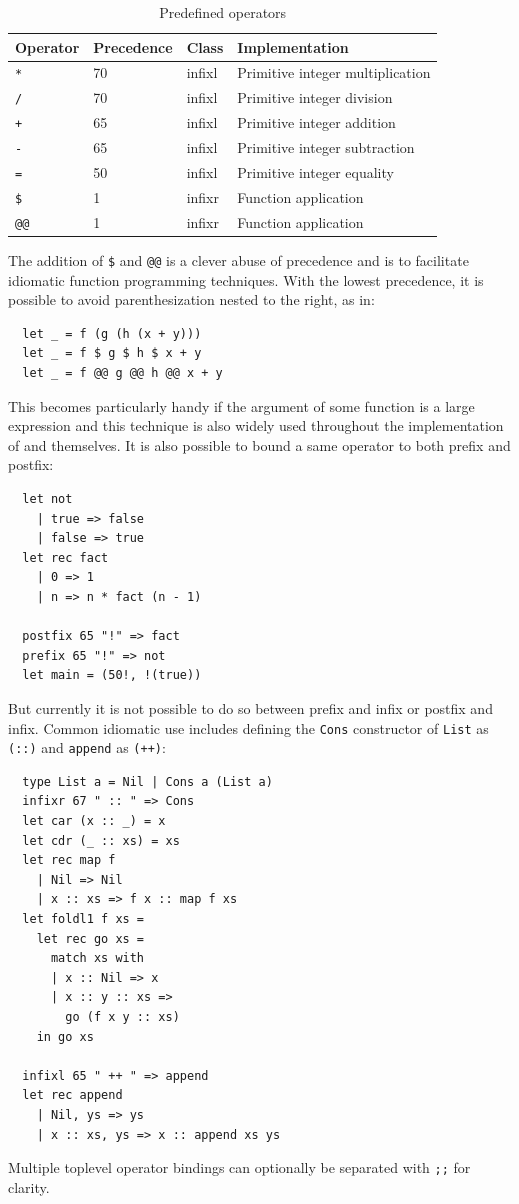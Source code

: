 \documentclass[a4paper, 11pt]{article}
\theoremstyle{remark}\newtheorem*{remark}{Remark}
\theoremstyle{definition}\newtheorem*{definition}{Definition}
\begin{document}
\begin{table}[]
  \centering
  \begin{tabular}{@{}llll@{}}
    \toprule
    Operator & Precedence & Class  & Implementation                   \\ \midrule
    \texttt{*}        & 70         & infixl & Primitive integer multiplication \\
    \texttt{/}        & 70         & infixl & Primitive integer division       \\
    \texttt{+}        & 65         & infixl & Primitive integer addition       \\
    \texttt{-}        & 65         & infixl & Primitive integer subtraction    \\
    \texttt{=}        & 50         & infixl & Primitive integer equality       \\
    \texttt{\$}       & 1          & infixr & Function application             \\
    \texttt{@@}       & 1          & infixr & Function application             \\ \bottomrule
  \end{tabular}
  \caption{Predefined operators}\label{tab:exproperator-prec}
\end{table}
The addition of \texttt{\$} and \texttt{@@} is a clever abuse of precedence and
is to facilitate idiomatic function programming techniques.
With the lowest precedence, it is possible to avoid parenthesization nested to the right, as in:
\begin{verbatim}
  let _ = f (g (h (x + y)))
  let _ = f $ g $ h $ x + y
  let _ = f @@ g @@ h @@ x + y
\end{verbatim}
This becomes particularly handy if the argument of some function is a large expression and this technique
is also widely used throughout the implementation of \Tigris and \Tigrisd themselves.
It is also possible to bound a same operator to both prefix and postfix:
\begin{verbatim}
  let not
    | true => false
    | false => true
  let rec fact
    | 0 => 1
    | n => n * fact (n - 1)

  postfix 65 "!" => fact
  prefix 65 "!" => not
  let main = (50!, !(true))
\end{verbatim}
But currently it is not possible to do so between prefix and infix or postfix and infix.
Common idiomatic use includes defining the \texttt{Cons} constructor of \texttt{List} as
\texttt{(::)} and \texttt{append} as \texttt{(++)}:
\begin{verbatim}
  type List a = Nil | Cons a (List a)
  infixr 67 " :: " => Cons
  let car (x :: _) = x
  let cdr (_ :: xs) = xs
  let rec map f
    | Nil => Nil
    | x :: xs => f x :: map f xs
  let foldl1 f xs =
    let rec go xs =
      match xs with
      | x :: Nil => x
      | x :: y :: xs =>
        go (f x y :: xs)
    in go xs

  infixl 65 " ++ " => append
  let rec append
    | Nil, ys => ys
    | x :: xs, ys => x :: append xs ys

\end{verbatim}
Multiple toplevel operator bindings can optionally be separated with \texttt{;;} for clarity.
\end{document}

